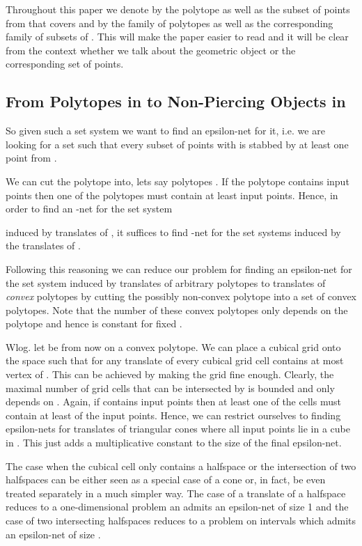 \documentclass{stacs_proc}
\begin{document}
 Throughout this paper we denote by  the polytope as well as
the subset of points from  that  covers and by  the family
of polytopes as well as the corresponding family of subsets of
. This will make the paper easier to read and it 
will be clear from the context whether we talk about the geometric
object or the corresponding set of points.


\subsection{From Polytopes in  to Non-Piercing Objects in }



So given such a set system  we want to find an epsilon-net
for it, i.e. we are looking for a set  such that every subset of
points  with  is stabbed by at least one point
from . 

We can cut the polytope  into, lets say  polytopes . If the polytope  contains  input points then one
of the polytopes  must contain at least 
input points. Hence, in order to find an -net for the set system
 
induced by translates of , it suffices to find -net
for the set systems induced by the translates of .

Following this reasoning we can reduce our problem for finding an
epsilon-net for the set system induced by translates of arbitrary
polytopes to translates of \emph{convex} polytopes by cutting the
possibly non-convex polytope into a set of convex polytopes.
Note that the number of these convex polytopes only depends on the
polytope  and hence is constant for fixed . 


Wlog. let  be from now on a convex polytope.
We can place a cubical grid onto the space  such that for
any translate of  every cubical grid cell contains at most
vertex of . This can be achieved by making the grid fine
enough. Clearly, the maximal number  of grid cells that can be
intersected by  is bounded and only depends on . Again, if
 contains  input points then at least one of the cells
must contain at least  of the input points. Hence, we
can restrict ourselves to finding epsilon-nets for translates of 
triangular cones
where all input points lie in a cube in . This just adds a
multiplicative constant to the size of the final epsilon-net.

The case when the cubical cell only contains a halfspace or the
intersection of two halfspaces can be either seen as a special case of
a cone or, in fact, be even treated separately in a much simpler
way. The case of a translate of a halfspace reduces to a
one-dimensional problem an admits an epsilon-net of size 1 and the
case of two intersecting halfspaces reduces to a problem on intervals
which admits an epsilon-net of size . 
\end{document}
